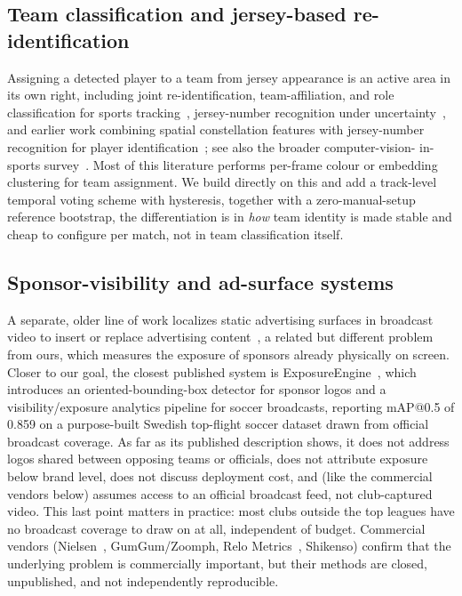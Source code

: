 \documentclass[conference,a4paper]{IEEEtran}
\begin{document}
\subsection{Team classification and jersey-based re-identification}
Assigning a detected player to a team from jersey appearance is an active area in its
own right, including joint re-identification, team-affiliation, and role classification
for sports tracking~\cite{team_reid_roles}, jersey-number recognition under
uncertainty~\cite{jersey_number_cvsports}, and earlier work combining spatial
constellation features with jersey-number recognition for player
identification~\cite{soccer_player_recognition}; see also the broader computer-vision-
in-sports survey~\cite{cv_sports_survey}. Most of this literature performs per-frame
colour or embedding clustering for team assignment. We build directly on this and add a
track-level temporal voting scheme with hysteresis, together with a zero-manual-setup
reference bootstrap, the differentiation is in \emph{how} team identity is made
stable and cheap to configure per match, not in team classification itself.

\subsection{Sponsor-visibility and ad-surface systems}
A separate, older line of work localizes static advertising surfaces in broadcast video
to insert or replace advertising content~\cite{virtual_ad_insertion,
billboard_insertion, billboard_detection_sport_tv}, a related but different problem
from ours, which measures the exposure of sponsors already physically on screen. Closer
to our goal, the closest published system is ExposureEngine~\cite{exposureengine}, which introduces
an oriented-bounding-box detector for sponsor logos and a visibility/exposure analytics
pipeline for soccer broadcasts, reporting mAP@0.5 of 0.859 on a purpose-built Swedish
top-flight soccer dataset drawn from official broadcast coverage. As far as its
published description shows, it does not address logos shared between opposing teams
or officials, does not attribute exposure below brand level, does not discuss
deployment cost, and (like the commercial vendors below) assumes access to an
official broadcast feed, not club-captured video. This last point matters in
practice: most clubs outside the top leagues have no broadcast coverage to draw on at
all, independent of budget. Commercial vendors
(Nielsen~\cite{nielsen_sponsorship_benchmark}, GumGum/Zoomph, Relo
Metrics~\cite{relometrics_ai}, Shikenso) confirm that the underlying problem is
commercially important, but their methods are closed, unpublished, and not independently
reproducible.
\end{document}
